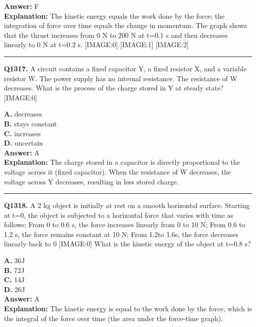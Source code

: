 \documentclass[12pt]{article}
\begin{document}
\textbf{Answer:} F \\
\textbf{Explanation:} The kinetic energy equals the work done by the force; the integration of force over time equals the change in momentum. The graph shows that the thrust increases from 0 N to 200 N at t=0.1 s and then decreases linearly to 0 N at t=0.2 s.
[IMAGE:0]
[IMAGE:1]
[IMAGE:2]

\hrule
\vspace{1em}


\noindent
\textbf{Q1317.} A circuit contains a fixed capacitor Y, a fixed resistor X, and a variable resistor W. The power supply has no internal resistance.
The resistance of W decreases. What is the process of the charge stored in Y at steady state?
[IMAGE:0]



\textbf{A.} decreases \\
\textbf{B.} stays constant \\
\textbf{C.} increases \\
\textbf{D.} uncertain \\

\textbf{Answer:} A \\
\textbf{Explanation:} The charge stored in a capacitor is directly proportional to the voltage across it (fixed capacitor). When the resistance of W decreases, the voltage across Y decreases, resulting in less stored charge.

\hrule
\vspace{1em}


\noindent
\textbf{Q1318.} A 2 kg object is initially at rest on a smooth horizontal surface. Starting at t=0, the object is subjected to a horizontal force that varies with time as follows:
From 0 to 0.6 s, the force increases linearly from 0 to 10 N;
From 0.6 to 1.2 s, the force remains constant at 10 N;
From 1.2to 1.6s, the force decreases linearly back to 0
[IMAGE:0]
What is the kinetic energy of the object at t=0.8 s?



\textbf{A.} 36J \\
\textbf{B.} 72J \\
\textbf{C.} 14J \\
\textbf{D.} 26J \\

\textbf{Answer:} A \\
\textbf{Explanation:} The kinetic energy is equal to the work done by the force, which is the integral of the force over time (the area under the force-time graph).
\end{document}
